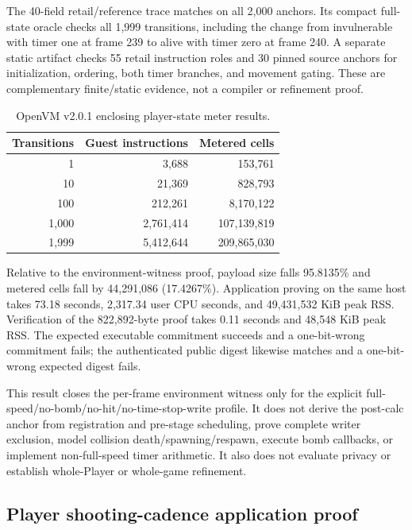 The 40-field retail/reference trace matches on all 2,000 anchors.  Its compact
full-state oracle checks all 1,999 transitions, including the change from
invulnerable with timer one at frame 239 to alive with timer zero at frame 240.
A separate static artifact checks 55 retail instruction roles and 30 pinned
source anchors for initialization, ordering, both timer branches, and movement
gating.  These are complementary finite/static evidence, not a compiler or
refinement proof.

\begin{table}[h]
  \centering
  \small
  \begin{tabular}{@{}rrr@{}}
    \toprule
    Transitions & Guest instructions & Metered cells \\
    \midrule
    1     & 3,688     & 153,761 \\
    10    & 21,369    & 828,793 \\
    100   & 212,261   & 8,170,122 \\
    1,000 & 2,761,414 & 107,139,819 \\
    1,999 & 5,412,644 & 209,865,030 \\
    \bottomrule
  \end{tabular}
  \caption{OpenVM v2.0.1 enclosing player-state meter results.}
  \label{tab:openvm-enclosing-meter}
\end{table}

Relative to the environment-witness proof, payload size falls 95.8135\% and
metered cells fall by 44,291,086 (17.4267\%).  Application proving on the same
host takes 73.18 seconds, 2,317.34 user CPU seconds, and 49,431,532 KiB peak
RSS.  Verification of the 822,892-byte proof takes 0.11 seconds and 48,548 KiB
peak RSS.  The expected executable commitment succeeds and a one-bit-wrong
commitment fails; the authenticated public digest likewise matches and a
one-bit-wrong expected digest fails.

This result closes the per-frame environment witness only for the explicit
full-speed/no-bomb/no-hit/no-time-stop-write profile.  It does not derive the
post-calc anchor from registration and pre-stage scheduling, prove complete
writer exclusion, model collision death/spawning/respawn, execute bomb
callbacks, or implement non-full-speed timer arithmetic.  It also does not
evaluate privacy or establish whole-Player or whole-game refinement.

\subsection{Player shooting-cadence application proof}

